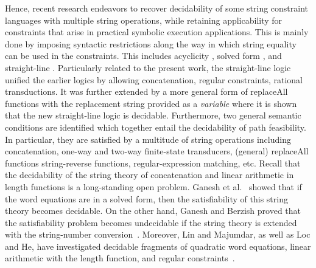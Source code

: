 {Hence,  recent research endeavors %
to recover decidability of some string constraint languages with multiple string operations, while retaining applicability for constraints that
arise in practical symbolic execution applications. This is mainly done by imposing syntactic restrictions along the way in which string equality can be used in the constraints. This includes acyclicity \cite{Abdulla14,BFL13}, solved form \cite{Vijay-length}, and straight-line \cite{LB16,HJLRV18,CCH+18}.
Particularly related to the present work, the straight-line logic \cite{LB16}  unified the earlier logics by allowing concatenation, regular constraints, rational
transductions. %
It was further extended %
by a more general form of replaceAll functions with the replacement string provided as a
\emph{variable} \cite{CCH+18} where it is shown that the new straight-line logic %
is decidable.  Furthermore, two general semantic conditions are identified  \cite{CHL+19}  which together entail the decidability of path
feasibility. In particular, they are satisfied by a multitude of string operations
including concatenation, one-way and two-way finite-state transducers, (general) replaceAll functions
string-reverse functions, regular-expression matching, etc. 
}
%
Recall that the decidability of the string theory of concatenation %
and linear arithmetic in length functions is a long-standing open problem. Ganesh et al.~\cite{Vijay-length} showed that if the word equations are in a solved form, then the satisfiability of this string theory becomes decidable. On the other hand, Ganesh and Berzish proved that the satisfiability problem becomes undecidable if the string theory is extended with the string-number conversion~\cite{GB16}. Moreover, Lin and Majumdar, as well as Loc and He, have investigated decidable fragments of %
quadratic word equations, linear arithmetic with the length function, and regular constraints~\cite{LinM18,LeH18}.

